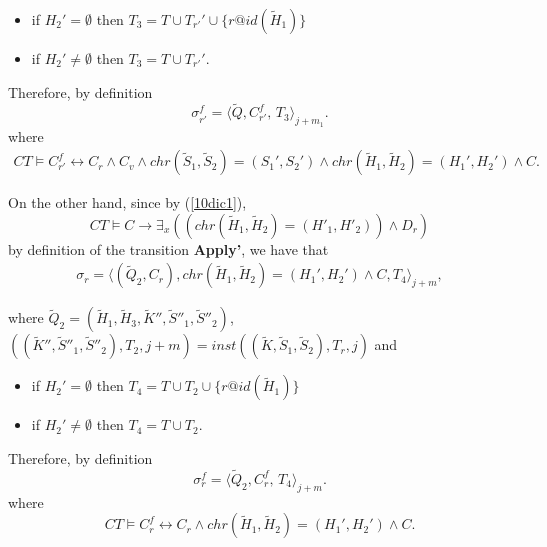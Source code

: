 \documentclass[final]{acmtrans2e}
\newcommand{\la}{\langle}
\newcommand{\ra}{\rangle}
\begin{document}
\begin{itemize}
    \item if $H_2'=\emptyset$ then $T_3=T \cup T_{r'}' \cup\{r @id (\tilde
H_1)\}$
    \item if $H_2'\not =\emptyset$ then $T_3=T \cup T_{r'}'$.
    \end{itemize}
    Therefore, by definition
    $$
    \sigma_{r'}^f=\la \tilde Q, C_{r'}^f, \, T_3\ra_{j+m_1}.$$
    where
    $$\begin{array}{l}
       CT \models C_{r'}^f \leftrightarrow  C_r\wedge  C_v\wedge chr(\tilde S_1, \tilde S_2)= (S_1', S_2') \wedge chr(\tilde H_1, \tilde H_2)= (H_1', H_2')\wedge C.
     \end{array}
    $$

On the other hand, since by (\ref{10dic1}),
\[CT\models C\rightarrow \exists_x((chr(\tilde H_1,
\tilde H_2)=(H'_1, H'_2))\wedge D_r)
\]
by definition of the transition \textbf{Apply'}, we have that
$$\begin{array}{l}
    \sigma_{r}=\la (\tilde Q_2, C_r),
          chr(\tilde H_1, \tilde H_2)= (H_1', H_2')\wedge C, T_4\ra_{j+m},
  \end{array}
  $$

     where $\tilde Q_2=(\tilde H_1,\tilde H_3,\tilde K'',\tilde S''_1,\tilde S''_2)$,\\
     $((\tilde K'',\tilde S''_1,\tilde S''_2), T_2, j+m) = inst ((\tilde K,\tilde S_1,\tilde S_2), T_r, j)$ and
\begin{itemize}
    \item if $H_2'=\emptyset$ then $T_4=T \cup T_2 \cup\{r @id (\tilde
H_1)\}$
    \item if $H_2'\not =\emptyset$ then $T_4=T \cup T_2$.
    \end{itemize}
    Therefore, by definition
    $$ \sigma_{r}^f=\la\tilde Q_2, C_{r}^f, \, T_4\ra_{j+m}.
  $$
  where
\begin{equation}\label{13marzo2}
CT \models C_{r}^f \leftrightarrow  C_r\wedge
     chr(\tilde H_1, \tilde H_2)= (H_1', H_2')\wedge C.
\end{equation}
\end{document}

